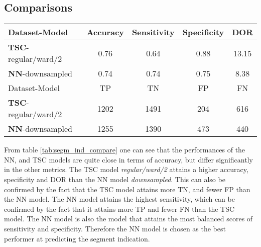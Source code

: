 \subsection{Comparisons}

\begin{table*}
    \centering
    \begin{tabular}{lcccc}
        \toprule
        Dataset-Model               & Accuracy & Sensitivity & Specificity & DOR \\
        \midrule
        \textbf{TSC}-regular/ward/2 &     0.76 &        0.64 &        0.88 & 13.15 \\
        \textbf{NN}-downsampled     &     0.74 &        0.74 &        0.75 & 8.38 \\
        \midrule
        Dataset-Model               &  TP  &  TN  &  FP  &  FN \\
        \midrule
        \textbf{TSC}-regular/ward/2 & 1202 & 1491 &  204 &  616 \\
        \textbf{NN}-downsampled     & 1255 & 1390 &  473 &  440 \\
        \bottomrule
    \end{tabular}
    \caption{A table comparing the best contenders within each model group for predicting segment indication. 
             The top table comprare the models by their accuracy, sensitivity, specificity and DOR, 
             and the bottom table shows the number of TPs, TNs, FPs and FNs that the different models attain.}
    \label{tab:segm_ind_compare}
\end{table*}

From table \ref{tab:segm_ind_compare} one can see that the performances of the NN, and TSC models are quite close in terms of accuracy,
but differ significantly in the other metrics. 
The TSC model \textit{regular/ward/2} attains a higher accuracy, specificity and DOR than the NN model \textit{downsampled}. 
This can also be confirmed by the fact that the TSC model attains more TN, and fewer FP than the NN model. 
The NN model attains the highest sensitivity, which can be confirmed by the fact that it attains more TP and fewer FN than the TSC model.
The NN model is also the model that attains the most balanced scores of sensitivity and specificity.
Therefore the NN model is chosen as the best performer at predicting the segment indication. 

